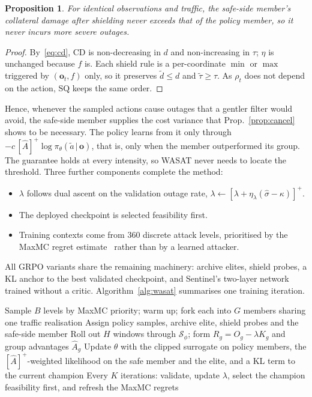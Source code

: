 \documentclass[journal]{IEEEtran}
\newtheorem{proposition}{Proposition}
\begin{document}
\begin{proposition}\label{prop:safe}
For identical observations and traffic, the safe-side member's collateral damage after shielding never exceeds that of the policy member, so it never incurs more severe outages.
\end{proposition}
\begin{proof}
By~\eqref{eq:cd}, $\mathrm{CD}$ is non-decreasing in $d$ and non-increasing in $\tau$; $\eta$ is unchanged because $f$ is. Each shield rule is a per-coordinate $\min$ or $\max$ triggered by $(\mathbf{o}_t,f)$ only, so it preserves $\tilde d\le d$ and $\tilde\tau\ge\tau$. As $\rho_t$ does not depend on the action, $\mathrm{SQ}$ keeps the same order.
\end{proof}

Hence, whenever the sampled actions cause outages that a gentler filter would avoid, the safe-side member supplies the cost variance that Prop.~\ref{prop:cancel} shows to be necessary. The policy learns from it only through $-c\,[\hat A]^+\log\pi_\theta(\tilde a\,|\,\mathbf{o})$, that is, only when the member outperformed its group. The guarantee holds at every intensity, so WASAT never needs to locate the threshold. Three further components complete the method:
\begin{itemize}
\item $\lambda$ follows dual ascent on the validation outage rate, $\lambda\leftarrow[\lambda+\eta_\lambda(\hat\sigma-\kappa)]^+$.
\item The deployed checkpoint is selected feasibility first.
\item Training contexts come from 360 discrete attack levels, prioritised by the MaxMC regret estimate~\cite{jiang2021robustplr,jiang2021plr} rather than by a learned attacker.
\end{itemize}
All GRPO variants share the remaining machinery: archive elites, shield probes, a KL anchor to the best validated checkpoint, and Sentinel's two-layer network trained without a critic. Algorithm~\ref{alg:wasat} summarises one training iteration.

\begin{algorithm}[t]
\caption{One WASAT training iteration}
\label{alg:wasat}
\small
\begin{algorithmic}[1]
\STATE Sample $B$ levels by MaxMC priority; warm up; fork each into $G$ members sharing one traffic realisation
\STATE Assign policy samples, archive elite, shield probes and the safe-side member
\STATE Roll out $H$ windows through $\mathcal{S}_\phi$; form $R_g=O_g-\lambda K_g$ and group advantages $\hat A_g$
\STATE Update $\theta$ with the clipped surrogate on policy members, the $[\hat A]^+$-weighted likelihood on the safe member and the elite, and a KL term to the current champion
\STATE Every $K$ iterations: validate, update $\lambda$, select the champion feasibility first, and refresh the MaxMC regrets
\end{algorithmic}
\end{algorithm}
\end{document}

